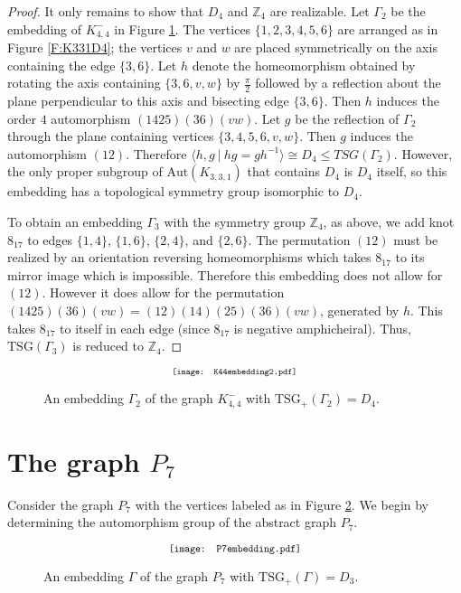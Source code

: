 \documentclass[11]{amsart}
\def\Z{\mathbb{Z}}
\def\TSG{{\mathrm{TSG}}}
\def\Aut{{\mathrm{Aut}}}
\theoremstyle{definition}
\theoremstyle{remark}
\begin{document}
\begin{proof}
It only remains to show that $D_4$ and $\Z_4$ are realizable.  Let $\Gamma_2$ be the embedding of $K_{4,4}^-$ in Figure \ref{F:K44edgeD4}.  The vertices $\{1, 2, 3, 4, 5, 6\}$ are arranged as in Figure \ref{F:K331D4}; the vertices $v$ and $w$ are placed symmetrically on the axis containing  the edge $\{3,6\}$.  Let $h$ denote the homeomorphism obtained by rotating the axis containing $\{3,6,v,w\}$ by $\frac{\pi}{2}$ followed by a reflection about the plane perpendicular to this axis and bisecting edge $\{3,6\}$. Then $h$ induces the order $4$ automorphism $(1425)(36)(vw)$.  Let $g$ be the reflection of $\Gamma_2$ through the plane containing vertices $\{3,4,5,6,v,w\}$.  Then $g$ induces the automorphism $(12)$.  Therefore $\langle h,g \ | \ hg=gh^{-1} \rangle \cong D_4 \leq TSG(\Gamma_2)$.  However, the only proper subgroup of $\Aut(K_{3,3,1})$ that contains $D_4$ is $D_4$ itself, so this embedding has a topological symmetry group isomorphic to $D_4$.

To obtain an embedding $\Gamma_3$ with the symmetry group $\Z_4$, as above, we add knot $8_{17}$ to edges $\{1,4\}$, $\{1,6\}$, $\{2,4\}$, and $\{2,6\}$.  The permutation $(12)$ must be realized by an orientation reversing homeomorphisms which takes $8_{17}$ to its mirror image which is impossible.  Therefore this embedding does not allow for $(12)$.  However it does allow for the permutation $(1425)(36)(vw)=(12)(14)(25)(36)(vw)$, generated by $h$. This takes $8_{17}$ to itself in each edge (since $8_{17}$ is negative amphicheiral). Thus, $\TSG(\Gamma_3)$ is reduced to $\Z_4$.  
\end{proof}

    \begin{figure} [htbp]
$$\scalebox{.7}{\texttt{[image: K44embedding2.pdf]}}$$
\caption{An embedding $\Gamma_2$ of the graph $K_{4,4}^-$ with $ \TSG_+(\Gamma_2) = D_4$.}
\label{F:K44edgeD4}
\end{figure}



\section{The graph $P_7$}\label{S:P7}

Consider the graph $P_7$ with the vertices labeled as in Figure \ref{F:P7}. We begin by determining the automorphism group of the abstract graph $P_7$.

\begin{figure} [htbp]
$$\scalebox{.8}{\texttt{[image: P7embedding.pdf]}}$$
\caption{An embedding $\Gamma$ of the graph $P_7$ with $\TSG_+(\Gamma) = D_3$.}
\label{F:P7}
\end{figure}
\end{document}
